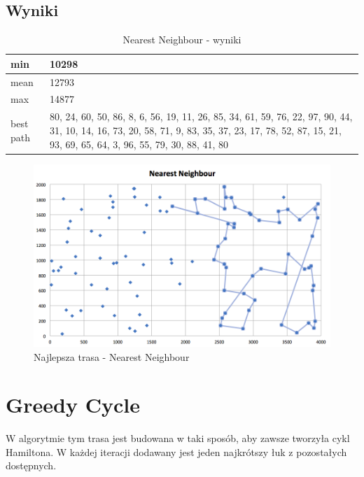 \documentclass[a4paper 10pt]{article}
\begin{document}
\subsection{Wyniki}
\begin{table}[H]
\center
\caption{Nearest Neighbour - wyniki}
\label{Nearest Neighbour - wyniki}
\begin{tabular}{|p{1cm}|p{14cm}|}
\hline
min       & 10298 \\ \hline
mean      & 12793                                                                                                                                                                                                 \\ \hline
max       & 14877 \\ \hline
best path & 80, 24, 60, 50, 86, 8, 6, 56, 19, 11, 26, 85, 34, 61, 59, 76, 22, 97, 90, 44, 31, 10, 14, 16, 73, 20, 58, 71, 9, 83, 35, 37, 23, 17, 78, 52, 87, 15, 21, 93, 69, 65, 64, 3, 96, 55, 79, 30, 88, 41, 80 \\ \hline
\end{tabular}
\end{table}

\begin{figure} [H]
\centering
\includegraphics[angle=0,width = 1\textwidth, height=!]{images/NN.png}
\caption{Najlepsza trasa - Nearest Neighbour}
\label{Rys. NN}
\end{figure}

\section{Greedy Cycle}
\label{Greedy}
W algorytmie tym trasa jest budowana w taki sposób, aby zawsze tworzyła cykl Hamiltona. W każdej iteracji dodawany jest jeden najkrótszy łuk z pozostałych dostępnych.
\end{document}
